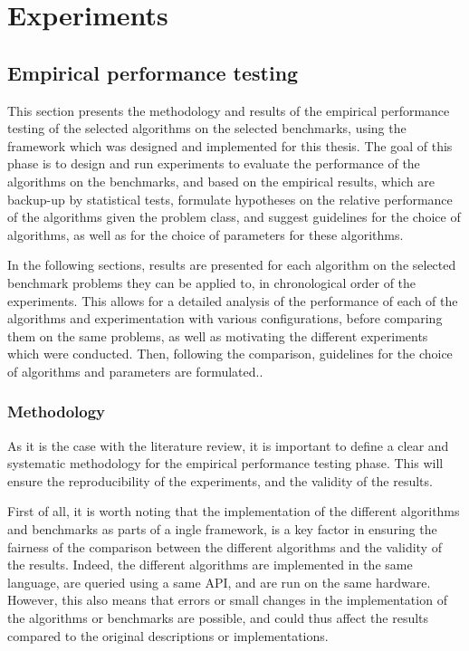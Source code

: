 \chapter{Experiments}
\label{chap:experiments}

\section{Empirical performance testing}

This section presents the methodology and results of the empirical performance testing of the selected algorithms on the selected benchmarks, using the framework which was designed and implemented for this thesis.
The goal of this phase is to design and run experiments to evaluate the performance of the algorithms on the benchmarks, and based on the empirical results, which are backup-up by statistical tests, formulate
hypotheses on the relative performance of the algorithms given the problem class, and suggest guidelines for the choice of algorithms, as well as for the choice of parameters for these algorithms.

In the following sections, results are presented for each algorithm on the selected benchmark problems they can be applied to, in chronological order of the experiments.
This allows for a detailed analysis of the performance of each of the algorithms and experimentation with various configurations, before comparing them on the same problems, as well as
motivating the different experiments which were conducted. Then, following the comparison, guidelines for the choice of algorithms and parameters are formulated..

\subsection{Methodology}

As it is the case with the literature review, it is important to define a clear and systematic methodology for the empirical performance testing phase. This will ensure the reproducibility of the experiments,
and the validity of the results.

First of all, it is worth noting that the implementation of the different algorithms and benchmarks as parts of a ingle framework, is a key factor in ensuring the fairness of the comparison between the different
algorithms and the validity of the results. Indeed, the different algorithms are implemented in the same language, are queried using a same API, and are run on the same hardware. However, this also means that
errors or small changes in the implementation of the algorithms or benchmarks are possible, and could thus affect the results compared to the original descriptions or implementations.

